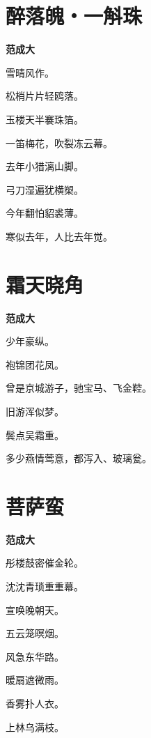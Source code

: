 \documentclass[12pt,a4paper]{ctexbook}
\begin{document}
\section{醉落魄・一斛珠}
\textbf{范成大}\par\vspace{0.5em}
雪晴风作。\par
松梢片片轻鸥落。\par
玉楼天半褰珠箔。\par
一笛梅花，吹裂冻云幕。\par
去年小猎漓山脚。\par
弓刀湿遍犹横槊。\par
今年翻怕貂裘薄。\par
寒似去年，人比去年觉。\par

\section{霜天晓角}
\textbf{范成大}\par\vspace{0.5em}
少年豪纵。\par
袍锦团花凤。\par
曾是京城游子，驰宝马、飞金鞚。\par
旧游浑似梦。\par
鬓点吴霜重。\par
多少燕情莺意，都泻入、玻璃瓮。\par

\section{菩萨蛮}
\textbf{范成大}\par\vspace{0.5em}
彤楼鼓密催金轮。\par
沈沈青琐重重幕。\par
宣唤晚朝天。\par
五云笼暝烟。\par
风急东华路。\par
暖扇遮微雨。\par
香雾扑人衣。\par
上林乌满枝。\par
\end{document}
